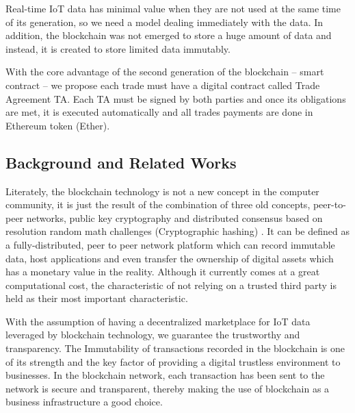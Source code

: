 \documentclass[letterpaper, 10 pt, conference]{ieeeconf}  %
\begin{document}
Real-time IoT data has minimal value when they are not used at the same time of its generation, so we need a model dealing immediately with the data. In addition, the blockchain was not emerged to store a huge amount of data and instead, it is created to store limited data immutably. 

With the core advantage of the second generation of the blockchain – smart contract – we propose each trade must have a digital contract called Trade Agreement TA. Each TA must be signed by both parties and once its obligations are met, it is executed automatically and all trades payments are done in Ethereum token (Ether).


\subsection{Background and Related Works} \label{RelatedWork&Background}

Literately, the blockchain technology is not a new concept in the computer community, it is just the result of the combination of three old concepts, peer-to-peer networks, public key cryptography and distributed consensus based on resolution random math challenges (Cryptographic hashing) \cite{2}. It can be defined as a fully-distributed, peer to peer network platform which can record immutable data, host applications \cite{2} and even transfer the ownership of digital assets which has a monetary value in the reality. Although it currently comes at a great computational cost, the characteristic of not relying on a trusted third party is held as their most important characteristic.

With the assumption of having a decentralized marketplace for IoT data leveraged by blockchain technology, we guarantee the trustworthy and transparency. The Immutability of transactions recorded in the blockchain is one of its strength and the key factor of providing a digital trustless environment to businesses. In the blockchain network, each transaction has been sent to the network is secure and transparent, thereby making the use of blockchain as a business infrastructure a good choice.
\end{document}
